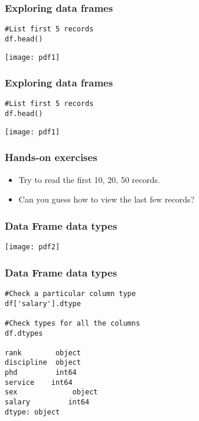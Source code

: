 \begin{frame}[fragile]
\frametitle{Exploring data frames}
\begin{lstlisting}
#List first 5 records
df.head()
\end{lstlisting}
\begin{center}
\texttt{[image: pdf1]}
\end{center}
\end{frame}

\begin{frame}[fragile]
\frametitle{Exploring data frames}
\begin{lstlisting}
#List first 5 records
df.head()
\end{lstlisting}
\begin{center}
\texttt{[image: pdf1]}
\end{center}

\end{frame}



\begin{frame}[fragile]
\frametitle{Hands-on exercises}
\begin{itemize}
\item Try to read the first 10, 20, 50 records.
\item Can you guess how to view the last few records?
\end{itemize}
\end{frame}
 
\begin{frame}[fragile]
\frametitle{Data Frame data types}

\begin{center}
\texttt{[image: pdf2]}
\end{center}

\end{frame}


\begin{frame}[fragile]
\frametitle{Data Frame data types}
\begin{lstlisting}
#Check a particular column type
df['salary'].dtype

#Check types for all the columns
df.dtypes

rank     	object        
discipline  object
phd 		int64
service    int64
sex             object 
salary         int64
dtype: object
\end{lstlisting}
\end{frame}


